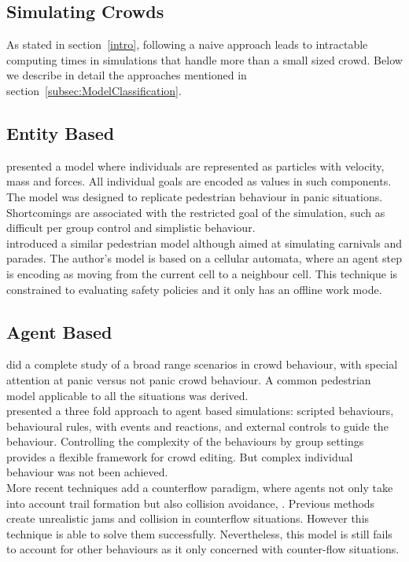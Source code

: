 \documentclass[6pt]{article} %
\begin{document}
\begin{multicols}{2}
\section{Simulating Crowds}

As stated in section~\ref{intro}, following a naive approach leads to intractable computing times in simulations that handle more than a small sized crowd.
Below we describe in detail the approaches mentioned in section~\ref{subsec:ModelClassification}. 

\subsection{Entity Based}

\cite{Helbing2000} presented a model where individuals are represented as particles with velocity, mass and forces.
All individual goals are encoded as values in such components.
The model was designed to replicate pedestrian behaviour in panic situations.
Shortcomings are associated with the restricted goal of the simulation, such as difficult per group control and simplistic behaviour.\\

\cite{batty2003} introduced a similar pedestrian model although aimed at simulating carnivals and parades.
The author's model is based on a cellular automata, where an agent step is encoding as moving from the current cell to a neighbour cell.
This technique is constrained to evaluating safety policies and it only has an offline work mode.

\subsection{Agent Based}

\cite{helbing2002} did a complete study of a broad range scenarios in crowd behaviour, with special attention at panic versus not panic crowd behaviour.
A common pedestrian model applicable to all the situations was derived.\\

\cite{raupp2001} presented a three fold approach to agent based simulations: scripted behaviours, behavioural rules, with events and reactions, and external controls to guide the behaviour.
Controlling the complexity of the behaviours by group settings provides a flexible framework for crowd editing.
But complex individual behaviour was not been achieved.\\

More recent techniques add a counterflow paradigm, where agents not only take into account trail formation but also collision avoidance, \cite{heliovaara2012}.
Previous methods create unrealistic jams and collision in counterflow situations.
However this technique is able to solve them successfully.
Nevertheless, this model is still fails to account for other behaviours as it only concerned with counter-flow situations.


\end{multicols}
\end{document}
